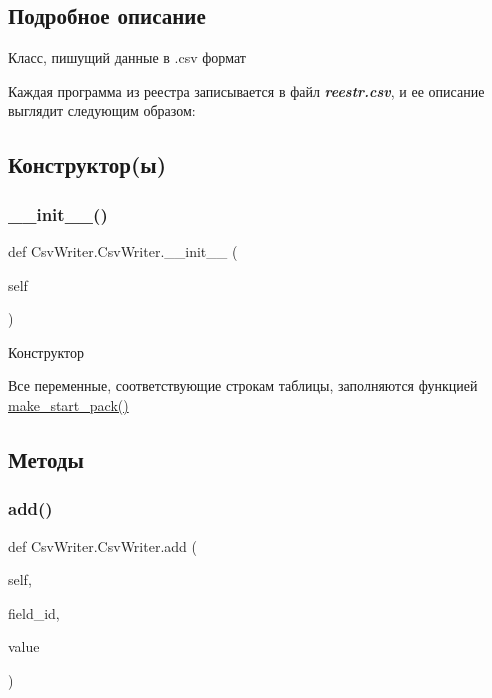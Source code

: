 \subsection{Подробное описание}
Класс, пишущий данные в {\ttfamily .csv} формат 

Каждая программа из реестра записывается в файл {\itshape {\bfseries reestr.\+csv}}, и ее описание выглядит следующим образом\+:  

\subsection{Конструктор(ы)}
\mbox{\label{classCsvWriter_1_1CsvWriter_aa46f0b7a79563167fff4906843f3ad00}} 
\subsubsection{\texorpdfstring{\+\_\+\+\_\+init\+\_\+\+\_\+()}{\_\_init\_\_()}}
{\footnotesize\ttfamily def Csv\+Writer.\+Csv\+Writer.\+\_\+\+\_\+init\+\_\+\+\_\+ (\begin{DoxyParamCaption}\item[{}]{self }\end{DoxyParamCaption})}



Конструктор 

Все переменные, соответствующие строкам таблицы, заполняются функцией \hyperlink{classCsvWriter_1_1CsvWriter_a82a1a0b729344761424248f4e8357abf}{make\+\_\+start\+\_\+pack()} 

\subsection{Методы}
\mbox{\label{classCsvWriter_1_1CsvWriter_aa15d806d5045226507d60be0b8e25fab}} 
\subsubsection{\texorpdfstring{add()}{add()}}
{\footnotesize\ttfamily def Csv\+Writer.\+Csv\+Writer.\+add (\begin{DoxyParamCaption}\item[{}]{self,  }\item[{}]{field\+\_\+id,  }\item[{}]{value }\end{DoxyParamCaption})}



